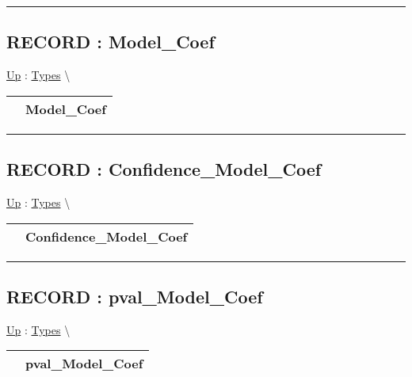 \par


\rule{\linewidth}{0.5pt}
\subsection*{RECORD : Model\_Coef}
\hypertarget{ecldoc:logisticregression.types.model_coef}{}
\hyperlink{ecldoc:LogisticRegression.Types}{Up} :
\hspace{0pt} \hyperlink{ecldoc:LogisticRegression.Types}{Types} \textbackslash 

{\renewcommand{\arraystretch}{1.5}
\begin{tabularx}{\textwidth}{|>{\raggedright\arraybackslash}l|X|}
\hline
\hspace{0pt} & Model\_Coef \\
\hline
\end{tabularx}
}

\par


\rule{\linewidth}{0.5pt}
\subsection*{RECORD : Confidence\_Model\_Coef}
\hypertarget{ecldoc:logisticregression.types.confidence_model_coef}{}
\hyperlink{ecldoc:LogisticRegression.Types}{Up} :
\hspace{0pt} \hyperlink{ecldoc:LogisticRegression.Types}{Types} \textbackslash 

{\renewcommand{\arraystretch}{1.5}
\begin{tabularx}{\textwidth}{|>{\raggedright\arraybackslash}l|X|}
\hline
\hspace{0pt} & Confidence\_Model\_Coef \\
\hline
\end{tabularx}
}

\par


\rule{\linewidth}{0.5pt}
\subsection*{RECORD : pval\_Model\_Coef}
\hypertarget{ecldoc:logisticregression.types.pval_model_coef}{}
\hyperlink{ecldoc:LogisticRegression.Types}{Up} :
\hspace{0pt} \hyperlink{ecldoc:LogisticRegression.Types}{Types} \textbackslash 

{\renewcommand{\arraystretch}{1.5}
\begin{tabularx}{\textwidth}{|>{\raggedright\arraybackslash}l|X|}
\hline
\hspace{0pt} & pval\_Model\_Coef \\
\hline
\end{tabularx}
}

